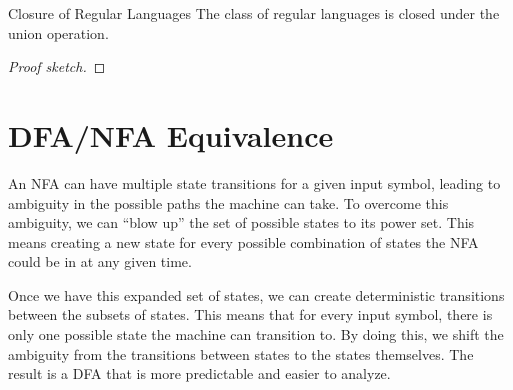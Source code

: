 \documentclass[math]{amznotes}
\begin{document}

\begin{thmbox}{Closure of Regular Languages}{}
    The class of regular languages is closed under the union operation.
    \tcblower
    \begin{proof}[Proof sketch]
    \end{proof}
\end{thmbox}


\section{DFA/NFA Equivalence}

An NFA can have multiple state transitions for a given input symbol, leading to ambiguity in the possible paths the machine can take. To overcome this ambiguity, we can ``blow up'' the set of possible states to its power set. This means creating a new state for every possible combination of states the NFA could be in at any given time.

Once we have this expanded set of states, we can create deterministic transitions between the subsets of states. This means that for every input symbol, there is only one possible state the machine can transition to. By doing this, we shift the ambiguity from the transitions between states to the states themselves. The result is a DFA that is more predictable and easier to analyze.
\end{document}
